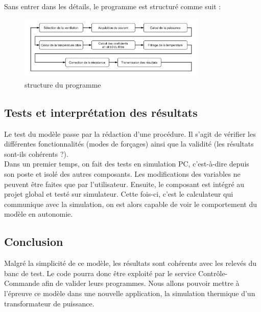 \documentclass[a4paper]{report}
\begin{document}
	Sans entrer dans les détails, le programme est structuré comme suit :
	
	\begin{figure}[h]			
		\centering
		\includegraphics[width=0.8\textwidth]{schema_programme}
		\caption{structure du programme}
		\label{schema:programme}
	\end{figure}
	
	
	\pagebreak %
	
	\subsection{Tests et interprétation des résultats}
	Le test du modèle passe par la rédaction d'une procédure. Il s'agit de vérifier les différentes fonctionnalités (modes de forçages) ainsi que la validité (les résultats sont-ils cohérents ?).\\
	
	Dans un premier temps, on fait des tests en simulation PC, c'est-à-dire depuis son poste et isolé des autres composants. Les modifications des variables ne peuvent être faites que par l'utilisateur. Ensuite, le composant est intégré au projet global et testé sur simulateur. Cette fois-ci, c'est le calculateur qui communique avec la simulation, on est alors capable de voir le comportement du modèle en autonomie.\\
	
	 
	\subsection{Conclusion}
	Malgré la simplicité de ce modèle, les résultats sont cohérents avec les relevés du banc de test. Le code pourra donc être exploité par le service Contrôle-Commande afin de valider leurs programmes. 
	Nous allons pouvoir mettre à l'épreuve ce modèle dans une nouvelle application, la simulation thermique d'un transformateur de puissance.
	
	\pagebreak %
		
\end{document}

